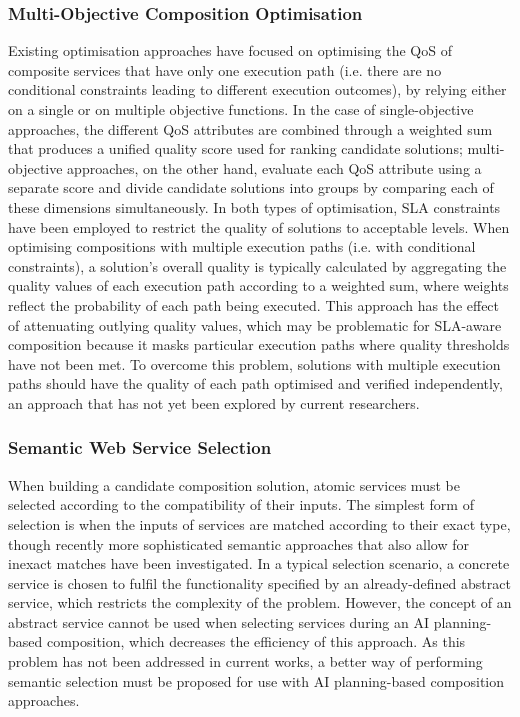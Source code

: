 \subsubsection{Multi-Objective Composition Optimisation}
Existing optimisation approaches have focused on optimising the QoS of composite services that have only one execution path (i.e. there are no conditional constraints leading to different execution outcomes), by relying either on a single or on multiple objective functions. In the case of single-objective approaches, the different QoS attributes are combined through a weighted sum that produces a unified quality score used for ranking candidate solutions; multi-objective approaches, on the other hand, evaluate each QoS attribute using a separate score and divide candidate solutions into groups by comparing each of these dimensions simultaneously. In both types of optimisation, SLA constraints have been employed to restrict the quality of solutions to acceptable levels. When optimising compositions with multiple execution paths (i.e. with conditional constraints), a solution's overall quality is typically calculated by aggregating the quality values of each execution path according to a weighted sum, where weights reflect the probability of each path being executed. This approach has the effect of attenuating outlying quality values, which may be problematic for SLA-aware composition because it masks particular execution paths where quality thresholds have not been met. To overcome this problem, solutions with multiple execution paths should have the quality of each path optimised and verified independently, an approach that has not yet been explored by current researchers.

\subsubsection{Semantic Web Service Selection}
When building a candidate composition solution, atomic services must be selected according to the compatibility of their inputs. The simplest form of selection is when the inputs of services are matched according to their exact type, though recently more sophisticated semantic approaches that also allow for inexact matches have been investigated. In a typical selection scenario, a concrete service is chosen to fulfil the functionality specified by an already-defined abstract service, which restricts the complexity of the problem. However, the concept of an abstract service cannot be used when selecting services during an AI planning-based composition, which decreases the efficiency of this approach. As this problem has not been addressed in current works, a better way of performing semantic selection must be proposed for use with AI planning-based composition approaches.

